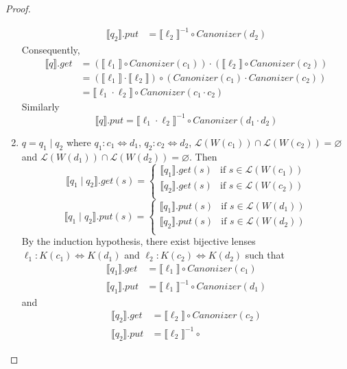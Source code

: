 \documentclass{svproc}
\begin{document}
\begin{proof}
\begin{enumerate}
\begin{align*}
\llbracket q_2 \rrbracket.put &= {\llbracket \ell_2 \rrbracket}^{-1} \circ
Canonizer(d_2)
\end{align*}
Consequently,
\begin{align*}
  \llbracket q \rrbracket.get &= (\llbracket \ell_1 \rrbracket \circ
Canonizer(c_1)) \cdot  (\llbracket \ell_2 \rrbracket \circ
Canonizer(c_2))\\
&= (\llbracket \ell_1 \rrbracket \cdot \llbracket \ell_2
\rrbracket) \circ (Canonizer(c_1) \cdot Canonizer(c_2))\\
&= \llbracket \ell_1 \cdot  \ell_2 \rrbracket \circ Canonizer(c_1 \cdot c_2)
\end{align*}
Similarly
$$
  \llbracket q \rrbracket.put = \llbracket \ell_1 \cdot  \ell_2 \rrbracket^{-1}
  \circ Canonizer(d_1 \cdot d_2) $$
  \item
  $q = q_1 \; | \; q_2$ where $q_1 : c_1 \Leftrightarrow d_1 $, $q_2 : c_2
  \Leftrightarrow d_2$, $\mathcal{L}(W(c_1)) \cap \mathcal{L}(W(c_2)) =
  \varnothing$ and $\mathcal{L}(W(d_1)) \cap \mathcal{L}(W(d_2)) = \varnothing$.
  Then
  $$
  \llbracket q_1 \; | \; q_2 \rrbracket.get(s) = 
  \begin{cases}
  \llbracket q_1 \rrbracket.get (s) & \text{if } s \in \mathcal{L}(W(c_1))\\
  \llbracket q_2 \rrbracket.get (s) & \text{if } s \in \mathcal{L}(W(c_2))\\
  \end{cases}$$
  $$\llbracket q_1 \; | \; q_2 \rrbracket.put(s) = 
  \begin{cases}
  \llbracket q_1 \rrbracket.put (s) & \text{if } s \in \mathcal{L}(W(d_1))\\
  \llbracket q_2 \rrbracket.put (s) & \text{if } s \in \mathcal{L}(W(d_2))\\
  \end{cases}
  $$
By the induction hypothesis, there exist bijective lenses $\ell_1 : K(c_1)
\Leftrightarrow K(d_1)$ and $\ell_2 : K(c_2) \Leftrightarrow K(d_2)$ such that
\begin{align*}
\llbracket q_1 \rrbracket.get &= \llbracket \ell_1 \rrbracket \circ
Canonizer(c_1)\\
\llbracket q_1 \rrbracket.put &= {\llbracket \ell_1 \rrbracket}^{-1} \circ
Canonizer(d_1)
\end{align*}
and
\begin{align*}
\llbracket q_2 \rrbracket.get &= \llbracket \ell_2 \rrbracket \circ
Canonizer(c_2)\\
\llbracket q_2 \rrbracket.put &= {\llbracket \ell_2 \rrbracket}^{-1} \circ

\end{align*}
\end{enumerate}
\end{proof}
\end{document}
